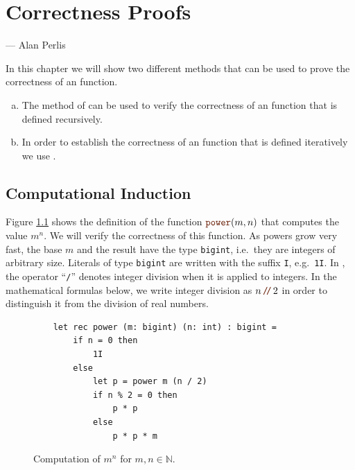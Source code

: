 \chapter{Correctness Proofs}
\epigraph{}{
    --- \calligfont Alan Perlis}

\noindent
In this chapter we will show two different methods that can be used to prove the correctness of an \Fsharp{}
function.
\begin{enumerate}[(a)]
\item The method of  can be used to verify the correctness of an \Fsharp{}
      function that is defined recursively.
\item In order to establish the correctness of an \Fsharp{} function that is defined iteratively we use
      . 
\end{enumerate}

\section{Computational Induction}
Figure \ref{fig:power.py} shows the definition of the function $\mytt{power}(m,n)$ that computes
the value $m^n$.  We will verify the correctness of this function.  As powers grow very fast, the base $m$
and the result have the type \texttt{bigint}, i.e.~they are integers of arbitrary size.  Literals of type
\texttt{bigint} are written with the suffix \texttt{I}, e.g.~\texttt{1I}.  In \Fsharp, the operator
``\texttt{/}'' denotes integer division when it is applied to integers.  In the mathematical formulas below, we
write integer division as $n \dv 2$ in order to distinguish it from the division of real numbers.

\begin{figure}[!h]
  \centering
\begin{verbatim}
    let rec power (m: bigint) (n: int) : bigint =
        if n = 0 then
            1I
        else
            let p = power m (n / 2)
            if n % 2 = 0 then
                p * p
            else
                p * p * m
\end{verbatim}
\vspace*{-0.3cm}
  \caption{Computation of $m^n$ for $m,n \in \mathbb{N}$.}
  \label{fig:power.py}
\end{figure} 

